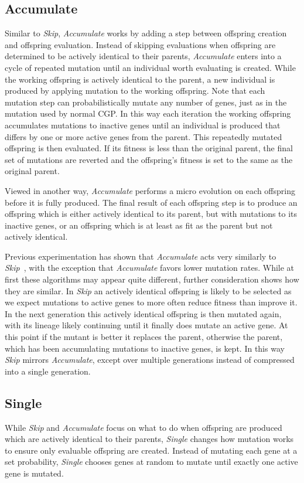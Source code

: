 \documentclass[journal]{IEEEtran}
\begin{document}
\subsection{Accumulate}
Similar to \emph{Skip}, \emph{Accumulate} works by adding a step between offspring
creation and offspring evaluation.  Instead of skipping evaluations when offspring
are determined to be actively identical to their parents, \emph{Accumulate} enters
into a cycle of repeated mutation until an individual worth evaluating is created.
While the working offspring is actively identical to the
parent, a new individual is produced by applying mutation to the working offspring.
Note that each mutation step can probabilistically mutate any number of genes, just
as in the mutation used by normal CGP.
In this way each iteration the working offspring accumulates mutations to inactive
genes until an individual is produced that differs by one or more active genes from
the parent.  This repeatedly mutated offspring is then evaluated.  If its fitness
is less than the original parent, the final set of mutations are reverted
and the offspring's fitness is set to the same as the original parent.

Viewed in another way, \emph{Accumulate} performs a micro evolution on each offspring
before it is fully produced.  The final result of each offspring step is to produce
an offspring which is either actively identical to its parent, but with mutations
to its inactive genes, or an offspring which is at least as fit as the parent but
not actively identical.

Previous experimentation has shown that \emph{Accumulate} acts very similarly to
\emph{Skip}~\cite{goldman:2013:cgpwaste}, with the exception that \emph{Accumulate}
favors lower mutation rates. While at first these algorithms may appear
quite different, further consideration shows how they are similar.  In \emph{Skip}
an actively identical offspring is likely to be selected as we expect mutations to
active genes to more often reduce fitness than improve it.  In the next generation
this actively identical offspring is then mutated again, with its lineage likely
continuing until it finally does mutate an active gene.  At this point if the
mutant is better it replaces the parent, otherwise the parent, which has been accumulating
mutations to inactive genes, is kept.  In this way \emph{Skip} mirrors \emph{Accumulate},
except over multiple generations instead of compressed into a single generation.

\subsection{Single}
While \emph{Skip} and \emph{Accumulate} focus on what to do when offspring are
produced which are actively identical to their parents, \emph{Single} changes
how mutation works to ensure only evaluable offspring are created.  Instead
of mutating each gene at a set probability, \emph{Single} chooses genes at
random to mutate until exactly one active gene is mutated.
\end{document}
